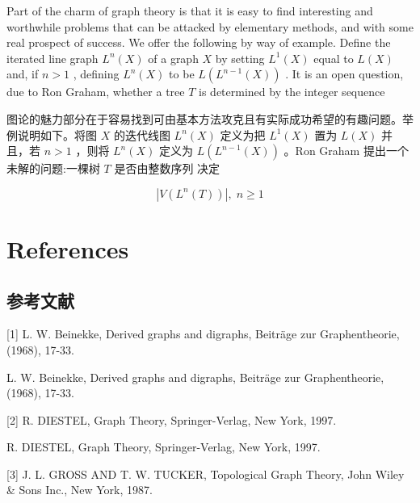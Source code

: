 \documentclass[10pt]{article}
\begin{document}
Part of the charm of graph theory is that it is easy to find interesting and worthwhile problems that can be attacked by elementary methods, and with some real prospect of success. We offer the following by way of example. Define the iterated line graph \({L}^{n}\left( X\right)\) of a graph \(X\) by setting \({L}^{1}\left( X\right)\) equal to \(L\left( X\right)\) and, if \(n > 1\) , defining \({L}^{n}\left( X\right)\) to be \(L\left( {{L}^{n - 1}\left( X\right) }\right)\) . It is an open question, due to Ron Graham, whether a tree \(T\) is determined by the integer sequence

\begin{tcolorbox}\relax
图论的魅力部分在于容易找到可由基本方法攻克且有实际成功希望的有趣问题。举例说明如下。将图 \(X\) 的迭代线图 \({L}^{n}\left( X\right)\) 定义为把 \({L}^{1}\left( X\right)\) 置为 \(L\left( X\right)\) 并且，若 \(n > 1\) ，则将 \({L}^{n}\left( X\right)\) 定义为 \(L\left( {{L}^{n - 1}\left( X\right) }\right)\) 。Ron Graham 提出一个未解的问题:一棵树 \(T\) 是否由整数序列 决定
\end{tcolorbox}

\[
\left| {V\left( {{L}^{n}\left( T\right) }\right) }\right| ,\;n \geq  1
\]

\section*{References}

\begin{tcolorbox}\relax
\section*{参考文献}
\end{tcolorbox}

[1] L. W. Beinekke, Derived graphs and digraphs, Beiträge zur Graphentheorie, (1968), 17-33.

\begin{tcolorbox}\relax
[1] L. W. Beinekke, Derived graphs and digraphs, Beiträge zur Graphentheorie, (1968), 17-33.
\end{tcolorbox}

[2] R. DIESTEL, Graph Theory, Springer-Verlag, New York, 1997.

\begin{tcolorbox}\relax
[2] R. DIESTEL, Graph Theory, Springer-Verlag, New York, 1997.
\end{tcolorbox}

[3] J. L. GROSS AND T. W. TUCKER, Topological Graph Theory, John Wiley \& Sons Inc., New York, 1987.
\end{document}
